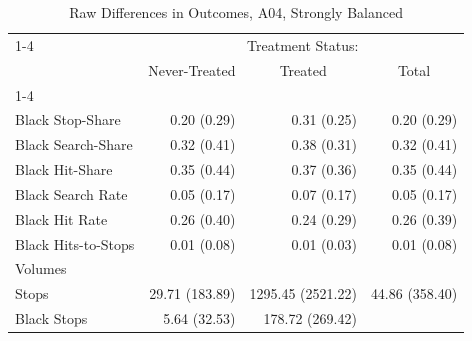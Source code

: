 \begin{table}[!h]
\caption{Raw Differences in Outcomes, A04, Strongly Balanced}
\centering
\begin{tabular}{llll}
\cline{1-4}
\multicolumn{1}{r}{} &
  \multicolumn{3}{c}{Treatment Status:} \\
\multicolumn{1}{r}{} &
  \multicolumn{1}{c}{Never-Treated} &
  \multicolumn{1}{c}{Treated} &
  \multicolumn{1}{c}{Total} \\
\cline{1-4}
\multicolumn{1}{l}{Rates} &
  \multicolumn{1}{r}{} &
  \multicolumn{1}{r}{} &
  \multicolumn{1}{r}{} \\
\multicolumn{1}{l}{\hspace{1em}Black Stop-Share} &
  \multicolumn{1}{r}{0.20 (0.29)} &
  \multicolumn{1}{r}{0.31 (0.25)} &
  \multicolumn{1}{r}{0.20 (0.29)} \\
\multicolumn{1}{l}{\hspace{1em}Black Search-Share} &
  \multicolumn{1}{r}{0.32 (0.41)} &
  \multicolumn{1}{r}{0.38 (0.31)} &
  \multicolumn{1}{r}{0.32 (0.41)} \\
\multicolumn{1}{l}{\hspace{1em}Black Hit-Share} &
  \multicolumn{1}{r}{0.35 (0.44)} &
  \multicolumn{1}{r}{0.37 (0.36)} &
  \multicolumn{1}{r}{0.35 (0.44)} \\
\multicolumn{1}{l}{\hspace{1em}Black Search Rate} &
  \multicolumn{1}{r}{0.05 (0.17)} &
  \multicolumn{1}{r}{0.07 (0.17)} &
  \multicolumn{1}{r}{0.05 (0.17)} \\
\multicolumn{1}{l}{\hspace{1em}Black Hit Rate} &
  \multicolumn{1}{r}{0.26 (0.40)} &
  \multicolumn{1}{r}{0.24 (0.29)} &
  \multicolumn{1}{r}{0.26 (0.39)} \\
\multicolumn{1}{l}{\hspace{1em}Black Hits-to-Stops} &
  \multicolumn{1}{r}{0.01 (0.08)} &
  \multicolumn{1}{r}{0.01 (0.03)} &
  \multicolumn{1}{r}{0.01 (0.08)} \\
\multicolumn{1}{l}{Volumes} &
  \multicolumn{1}{r}{} &
  \multicolumn{1}{r}{} &
  \multicolumn{1}{r}{} \\
\multicolumn{1}{l}{\hspace{1em}Stops} &
  \multicolumn{1}{r}{29.71 (183.89)} &
  \multicolumn{1}{r}{1295.45 (2521.22)} &
  \multicolumn{1}{r}{44.86 (358.40)} \\
\multicolumn{1}{l}{\hspace{1em}Black Stops} &
  \multicolumn{1}{r}{5.64 (32.53)} &
  \multicolumn{1}{r}{178.72 (269.42)} &

\end{tabular}
\end{table}
